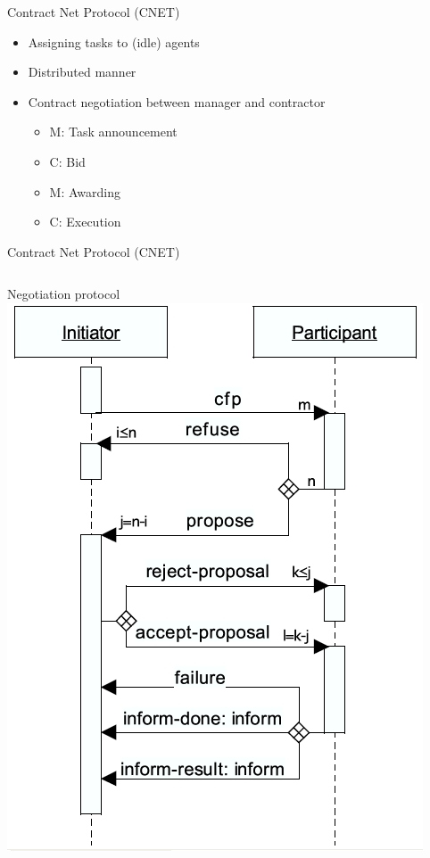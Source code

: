 \documentclass{beamer}
\begin{document}
	\begin{frame}{Contract Net Protocol (CNET)}
		\begin{itemize}
			\item Assigning tasks to (idle) agents
			\item Distributed manner
			\item Contract negotiation between manager and contractor
			\begin{itemize}
				\item M: Task announcement
				\item C: Bid
				\item M: Awarding
				\item C: Execution
			\end{itemize}
		\end{itemize}
	\end{frame}
	
	\begin{frame}{Contract Net Protocol (CNET)}
	  \begin{columns}[T] %
	   Negotiation protocol
	   \includegraphics[width=\columnwidth]{FIPA-CNET}
	  \end{columns}
	\end{frame}
\end{document}
